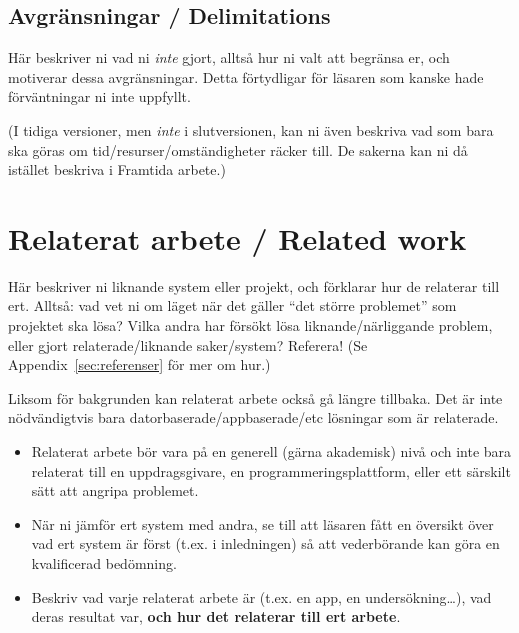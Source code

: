 \documentclass[a4paper,12pt]{article}
\begin{document}

\subsection{Avgränsningar / Delimitations}
Här beskriver ni vad ni \emph{inte} gjort, alltså hur ni valt att begränsa er, och motiverar dessa avgränsningar. Detta förtydligar för läsaren som kanske hade förväntningar ni inte uppfyllt.

(I tidiga versioner, men \emph{inte} i slutversionen, kan ni även beskriva vad som bara ska göras om tid/resurser/omständigheter räcker till. De sakerna kan ni då istället beskriva i Framtida arbete.)

\section{Relaterat arbete / Related work}
Här beskriver ni liknande system eller projekt, och förklarar hur de relaterar till ert.  Alltså: vad vet ni om läget när det gäller ``det större problemet'' som projektet ska lösa?  Vilka andra har försökt lösa liknande/närliggande problem, eller gjort relaterade/liknande saker/system? Referera! (Se Appendix~\ref{sec:referenser} för mer om hur.)

Liksom för bakgrunden kan relaterat arbete också gå längre tillbaka. Det är inte nödvändigtvis bara datorbaserade/appbaserade/etc lösningar som är relaterade.

\begin{itemize}
	\item
	Relaterat arbete bör vara på en generell (gärna akademisk) nivå och inte bara relaterat till en uppdragsgivare, en programmeringsplattform, eller ett särskilt sätt att angripa problemet.
	\item
	När ni jämför ert system med andra, se till att läsaren fått en översikt över vad ert system är först (t.ex. i inledningen) så att vederbörande kan göra en kvalificerad bedömning.
\item Beskriv vad varje relaterat arbete är (t.ex. en app, en undersökning\ldots), vad deras resultat var, \textbf{och hur det relaterar till ert arbete}.
\end{itemize}
\end{document}
